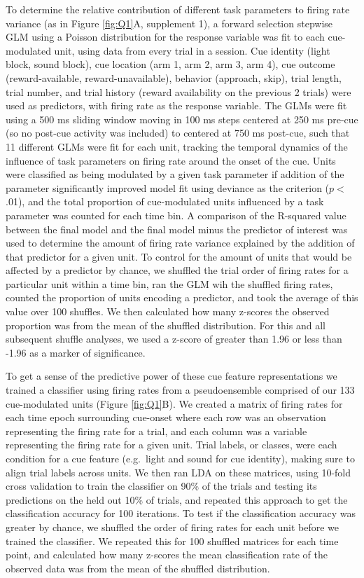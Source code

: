 \documentclass[11pt]{article}
\begin{document}
To determine the relative contribution of different task parameters to firing rate variance (as in Figure \ref{fig:Q1}A, supplement 1), a forward selection stepwise GLM using a Poisson distribution for the response variable was fit to each cue-modulated unit, using data from every trial in a session. Cue identity (light block, sound block), cue location (arm 1, arm 2, arm 3, arm 4), cue outcome (reward-available, reward-unavailable), behavior (approach, skip), trial length, trial number, and trial history (reward availability on the previous 2 trials) were used as predictors, with firing rate as the response variable. The GLMs were fit using a 500 ms sliding window moving in 100 ms steps centered at 250 ms pre-cue (so no post-cue activity was included) to centered at 750 ms post-cue, such that 11 different GLMs were fit for each unit, tracking the temporal dynamics of the influence of task parameters on firing rate around the onset of the cue. Units were classified as being modulated by a given task parameter if addition of the parameter significantly improved model fit using deviance as the criterion ($p <$ .01), and the total proportion of cue-modulated units influenced by a task parameter was counted for each time bin. A comparison of the R-squared value between the final model and the final model minus the predictor of interest was used to determine the amount of firing rate variance explained by the addition of that predictor for a given unit. To control for the amount of units that would be affected by a predictor by chance, we shuffled the trial order of firing rates for a particular unit within a time bin, ran the GLM wih the shuffled firing rates, counted the proportion of units encoding a predictor, and took the average of this value over 100 shuffles. We then calculated how many z-scores the observed proportion was from the mean of the shuffled distribution. For this and all subsequent shuffle analyses, we used a z-score of greater than 1.96 or less than -1.96 as a marker of significance.

To get a sense of the predictive power of these cue feature representations we trained a classifier using firing rates from a pseudoensemble comprised of our 133 cue-modulated units (Figure \ref{fig:Q1}B). We created a matrix of firing rates for each time epoch surrounding cue-onset where each row was an observation representing the firing rate for a trial, and each column was a variable representing the firing rate for a given unit. Trial labels, or classes, were each condition for a cue feature (e.g.\ light and sound for cue identity), making sure to align trial labels across units. We then ran LDA on these matrices, using 10-fold cross validation to train the classifier on 90\% of the trials and testing its predictions on the held out 10\% of trials, and repeated this approach to get the classification accuracy for 100 iterations. To test if the classification accuracy was greater by chance, we shuffled the order of firing rates for each unit before we trained the classifier. We repeated this for 100 shuffled matrices for each time point, and calculated how many z-scores the mean classification rate of the observed data was from the mean of the shuffled distribution.
\end{document}
